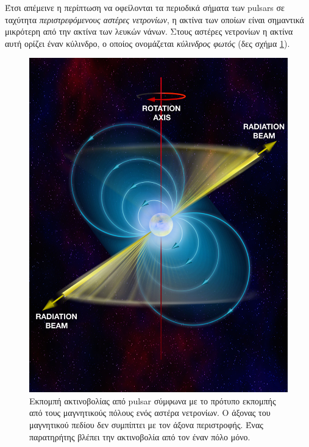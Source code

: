 Έτσι απέμεινε η περίπτωση να οφείλονται τα περιοδικά σήματα των pulsars σε ταχύτητα \textit{περιστρεφόμενους αστέρες νετρονίων}, η ακτίνα των οποίων είναι σημαντικά μικρότερη από την ακτίνα των λευκών νάνων. Στους αστέρες νετρονίων η ακτίνα αυτή ορίζει έναν κύλινδρο, ο οποίος ονομάζεται \textit{κύλινδρος φωτός} (δες σχήμα \ref{fig:pulsar}).


\begin{figure}
	\centering
	\includegraphics[scale=0.25]{Figures/pulsar.jpeg}
    \caption{Εκπομπή ακτινοβολίας από pulsar σύμφωνα με το πρότυπο εκπομπής από τους μαγνητικούς πόλους ενός αστέρα νετρονίων. Ο άξονας του μαγνητικού πεδίου δεν συμπίπτει με τον άξονα περιστροφής. Ένας παρατηρήτης βλέπει την ακτινοβολία από τον έναν πόλο μόνο.}
    \label{fig:pulsar}
\end{figure}

